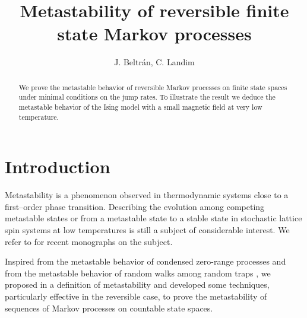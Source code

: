 \documentclass[reqno]{amsart}
\begin{document}
\title[Metastability of Markov chains]{Metastability of reversible
  finite state Markov processes}

\author{J. Beltr\'an, C. Landim}

\address{\noindent IMCA, Calle los Bi\'ologos 245, Urb. San C\'esar
  Primera Etapa, Lima 12, Per\'u and PUCP, Av. Universitaria cdra. 18,
  San Miguel, Ap. 1761, Lima 100, Per\'u. 
\newline e-mail: \rm
  \texttt{johel@impa.br} }

\address{\noindent IMPA, Estrada Dona Castorina 110, CEP 22460 Rio de
  Janeiro, Brasil and CNRS UMR 6085, Universit\'e de Rouen, Avenue de
  l'Universit\'e, BP.12, Technop\^ole du Madril\-let, F76801
  Saint-\'Etienne-du-Rouvray, France.  \newline e-mail: \rm
  \texttt{landim@impa.br} }


\begin{abstract}
  We prove the metastable behavior of reversible Markov processes on
  finite state spaces under minimal conditions on the jump rates. To
  illustrate the result we deduce the metastable behavior of the Ising
  model with a small magnetic field at very low temperature.
\end{abstract}

\maketitle

\section{Introduction}
\label{sec0}

Metastability is a phenomenon observed in thermodynamic systems close
to a first--order phase transition. Describing the evolution among
competing metastable states or from a metastable state to a stable
state in stochastic lattice spin systems at low temperatures is still
a subject of considerable interest. We refer to \cite{h1, ov, b2, h2}
for recent monographs on the subject.

Inspired from the metastable behavior of condensed zero-range
processes \cite{bl3} and from the metastable behavior of random walks
among random traps \cite{jlt1, jlt2}, we proposed in \cite{bl2} a
definition of metastability and developed some techniques,
particularly effective in the reversible case, to prove the
metastability of sequences of Markov processes on countable state
spaces.
\end{document}
